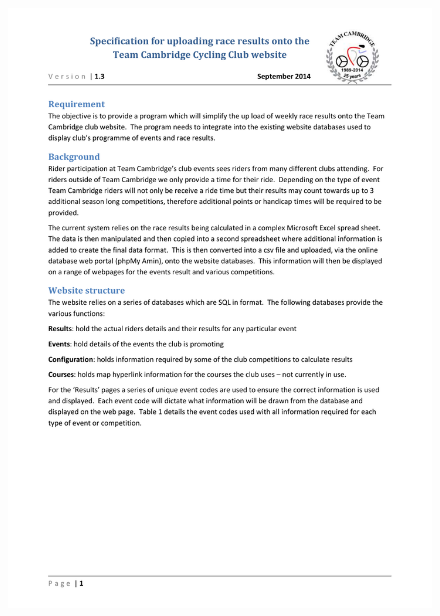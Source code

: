 \begin{figure}[H]
    \includegraphics[width=\textwidth]{./TeamCambridgeSpec/page1.pdf}
\end{figure}

